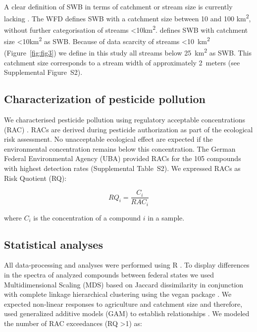 \documentclass[journal=esthag,manuscript=article]{achemso}
\begin{document}
A clear definition of SWB in terms of catchment or stream size is currently lacking \citep{lorenz_specifics_2016}. 
The WFD defines SWB with a catchment size between 10 and 100 km\textsuperscript{2}, without further categorisation of streams \textless 10km\textsuperscript{2}. 
\citet{lorenz_specifics_2016} defines SWB with catchment size \textless 10km\textsuperscript{2} as SWB.
Because of data scarcity of streams \textless 10~km\textsuperscript{2} (Figure~\ref{fig:fig3}) we define in this study all streams below 25~km\textsuperscript{2} as SWB. This catchment size corresponds to a stream width of approximately 2~meters (see Supplemental Figure~S2).


\subsection{Characterization of pesticide pollution}
We characterised pesticide pollution using regulatory acceptable concentrations (RAC) \citep{brock_linking_2010}.
RACs are derived during pesticide authorization as part of the ecological risk assessment.
No unacceptable ecological effect are expected if the environmental concentration remains below this concentration. 
The German Federal Environmental Agency (UBA) provided RACs for the 105 compounds with highest detection rates (Supplemental Table~S2). 
We expressed RACs as Risk Quotient (RQ):

\begin{equation}
RQ_i = \frac{C_i}{RAC_i}
\end{equation}

where $C_i$ is the concentration of a compound $i$ in a sample.


\subsection{Statistical analyses}
All data-processing and analyses were performed using R \citep{r_core_team_r:_2016}.
To display differences in the spectra of analyzed compounds between federal states we used Multidimensional Scaling (MDS) based on Jaccard dissimilarity in conjunction with complete linkage hierarchical clustering using the vegan package \citep{oksanen_vegan:_2016}.
We expected non-linear responses to agriculture and catchment size and therefore, used generalized additive models (GAM) to establish relationships \citep{fewster_analysis_2000}.
We modeled the number of RAC exceedances (RQ \textgreater 1) as:
\end{document}
